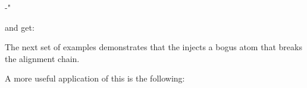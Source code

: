 \startbuffer[temp]
\advance\mathdoublescriptmode
   -"\tohexadecimal{}
\stopbuffer

\typebuffer[temp]

and get:

{}

\startbuffer
{}
\stopbuffer

\typebuffer \getbuffer[show:3]

The next set of examples demonstrates that the \type {\noscript} injects a bogus
atom that breaks the alignment chain.

\startbuffer
{} \quad
{} \quad
{} \quad
{}
\stopbuffer

\typebuffer \getbuffer[show:3]

\startbuffer
{} \quad
{} \quad
{} \quad
{}
\stopbuffer

\typebuffer \getbuffer[show:3]

A more useful application of this is the following:

\startbuffer
{}
\stopbuffer

\typebuffer \getbuffer[show:3]

